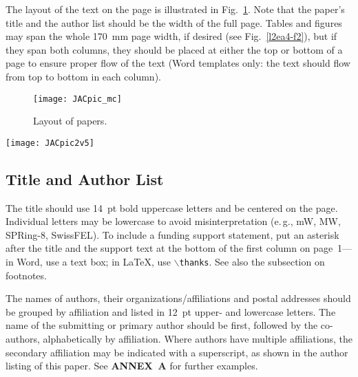\documentclass[letterpaper,  %
              ]{jacow-2_3}   %
\newcommand\SEC[1]{\textbf{\uppercase{#1}}}
\begin{document}
{{The layout of the text on the page is illustrated in
Fig.~\ref{l2ea4-f1}. Note that the paper’s title and the author list should
be the width of the full page. Tables and figures may span
the whole \SI{170}{mm} page width, if desired (see Fig.~\ref{l2ea4-f2}), but
if they span both columns, they should be placed at either
the top or bottom of a page to ensure proper flow of the
text (Word templates only: the text should flow from top
to bottom in each column).

\begin{figure}[!htb]
   \centering
   \texttt{[image: JACpic\_mc]}
   \caption{Layout of papers.}
   \label{l2ea4-f1}
\end{figure}

\begin{figure*}[!tbh]
    \centering
    \texttt{[image: JACpic2v5]}

    \caption{Example of a full-width figure showing the JACoW Team at their annual
    	     meeting in 2015. This figure has a multi-line caption that has to be
    	     justified rather than centered.}
    \label{l2ea4-f2}
\end{figure*}

\subsection{Title and Author List}

The title should use \SI{14}{pt} bold uppercase letters and be centered on the page.
Individual letters may be lowercase to avoid misinterpretation (e.\,g., mW, MW, SPRing-8, SwissFEL).
To include a funding support statement, put an asterisk after the title and
the support text at the bottom of the first column on page~1---in Word,
use a text box; in \LaTeX, use $\backslash$\texttt{thanks}. See also the
subsection on footnotes.

The names of authors, their organizations/affiliations and
postal addresses should be grouped by affiliation and
listed in \SI{12}{pt} upper- and lowercase letters. The name of
the submitting or primary author should be first, followed
by the co-authors, alphabetically by affiliation. Where
authors have multiple affiliations, the secondary affiliation
may be indicated with a superscript, as shown in the
author listing of this paper. See \SEC{Annex~A} for further examples.

}}
\end{document}

